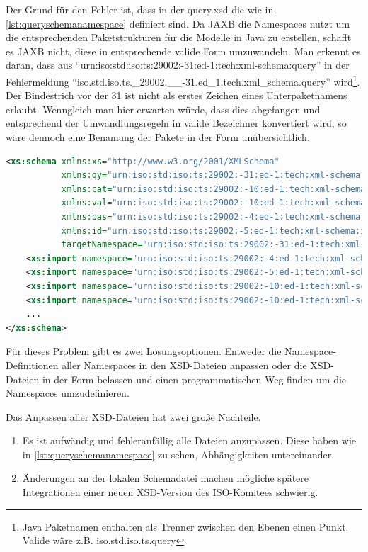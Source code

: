 Der Grund für den Fehler ist, dass in der query.xsd die  wie in  \autoref{lst:queryschemanamespace} definiert sind. Da JAXB die \Glspl{Namespace} nutzt um die entsprechenden Paketstrukturen für die Modelle in Java zu erstellen, schafft es JAXB nicht, diese in entsprechende valide Form umzuwandeln. Man erkennt es daran, dass aus \enquote{urn:iso:std:iso:ts:29002:-31:ed-1:tech:xml-schema:query} in der Fehlermeldung \enquote{iso.std.iso.ts.\_29002.\_\_-31.ed\_1.tech.xml\_schema.query} wird\footnote{Java Paketnamen enthalten als Trenner zwischen den Ebenen einen Punkt. Valide wäre z.B. iso.std.iso.ts.query}. Der Bindestrich vor der 31 ist nicht als erstes Zeichen eines  Unterpaketnamens erlaubt. Wenngleich man hier erwarten würde, dass dies abgefangen und entsprechend der Umwandlungsregeln in valide Bezeichner konvertiert wird, so wäre dennoch eine Benamung der Pakete in der Form unübersichtlich.  

\begin{lstlisting}[caption=query.xsd Namespace Definitionen, language=XML, label=lst:queryschemanamespace]
<xs:schema xmlns:xs="http://www.w3.org/2001/XMLSchema"
           xmlns:qy="urn:iso:std:iso:ts:29002:-31:ed-1:tech:xml-schema:query"
           xmlns:cat="urn:iso:std:iso:ts:29002:-10:ed-1:tech:xml-schema:catalogue"
           xmlns:val="urn:iso:std:iso:ts:29002:-10:ed-1:tech:xml-schema:value"
           xmlns:bas="urn:iso:std:iso:ts:29002:-4:ed-1:tech:xml-schema:basic"
           xmlns:id="urn:iso:std:iso:ts:29002:-5:ed-1:tech:xml-schema:identifier"
           targetNamespace="urn:iso:std:iso:ts:29002:-31:ed-1:tech:xml-schema:query" elementFormDefault="qualified">
    <xs:import namespace="urn:iso:std:iso:ts:29002:-4:ed-1:tech:xml-schema:basic" schemaLocation="basic.xsd"/>
    <xs:import namespace="urn:iso:std:iso:ts:29002:-5:ed-1:tech:xml-schema:identifier" schemaLocation="identifier.xsd"/>
    <xs:import namespace="urn:iso:std:iso:ts:29002:-10:ed-1:tech:xml-schema:catalogue" schemaLocation="catalogue.xsd"/>
    <xs:import namespace="urn:iso:std:iso:ts:29002:-10:ed-1:tech:xml-schema:value" schemaLocation="value.xsd"/>
    ...
</xs:schema>    
\end{lstlisting}

Für dieses Problem gibt es zwei Lösungsoptionen. Entweder die Namespace-Definitionen aller Namespaces in den XSD-Dateien anpassen oder die XSD-Dateien in der Form belassen und einen programmatischen Weg finden um die Namespaces umzudefinieren. 

Das Anpassen aller XSD-Dateien hat zwei große Nachteile.
\begin{enumerate}
\item Es ist aufwändig und fehleranfällig alle Dateien anzupassen. Diese haben wie in \autoref{lst:queryschemanamespace} zu sehen, Abhängigkeiten untereinander.
\item Änderungen an der lokalen Schemadatei machen mögliche spätere Integrationen einer neuen XSD-Version des ISO-Komitees schwierig.
\end{enumerate}

